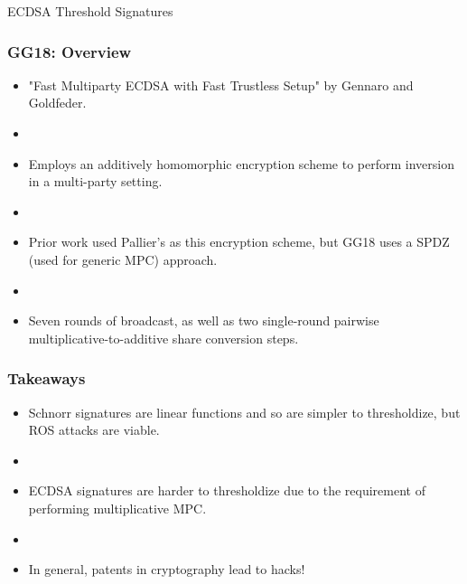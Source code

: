 \documentclass[hyperref={pdfpagelabels=true},table,dvipsnames,14pt,aspectratio=169]{beamer}
\begin{document}
\begin{frame}
  \huge 
  ECDSA Threshold Signatures
\end{frame}


\begin{frame}
  \frametitle{GG18: Overview}

  \begin{itemize}
    \item<1-> "Fast Multiparty ECDSA with Fast Trustless Setup" by Gennaro and Goldfeder. 
    \item[]
    \item<2-> Employs an additively homomorphic encryption scheme to perform inversion in a multi-party setting. 
    \item[]
    \item<3-> Prior work used Pallier's as this encryption scheme, but GG18 uses a SPDZ (used for generic MPC) approach. 
    \item[]
    \item<4-> Seven rounds of broadcast, as well as two single-round pairwise multiplicative-to-additive share conversion steps. 
  \end{itemize}
\end{frame}










\begin{frame}
  \frametitle{Takeaways}

  \begin{itemize}
    \item Schnorr signatures are linear functions and so are simpler to thresholdize, but ROS attacks are viable.  
    \item[]
    \item ECDSA signatures are harder to thresholdize due to the requirement of performing multiplicative MPC. 
    \item[]
    \item In general, patents in cryptography lead to hacks!
  \end{itemize}
\end{frame}
\end{document}

